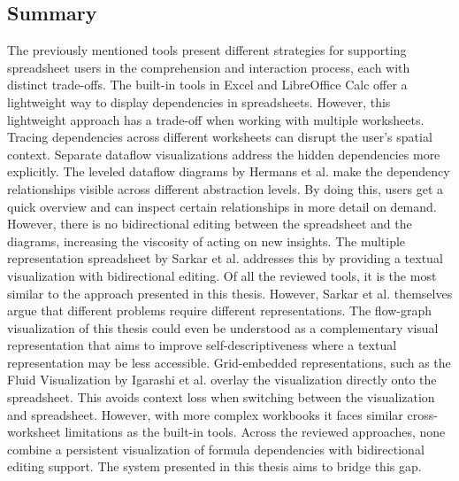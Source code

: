 \subsection{Summary}
The previously mentioned tools present different strategies for supporting spreadsheet users in the comprehension and interaction process, each with distinct trade-offs.
The built-in tools in Excel and LibreOffice Calc offer a lightweight way to display dependencies in spreadsheets. However, this lightweight approach has a trade-off when working with multiple worksheets. Tracing dependencies across different worksheets can disrupt the user's spatial context.
Separate dataflow visualizations address the hidden dependencies more explicitly. The leveled dataflow diagrams by Hermans et al. make the dependency relationships visible across different abstraction levels. By doing this, users get a quick overview and can inspect certain relationships in more detail on demand. However, there is no bidirectional editing between the spreadsheet and the diagrams, increasing the viscosity of acting on new insights. The multiple representation spreadsheet by Sarkar et al. addresses this by providing a textual visualization with bidirectional editing. Of all the reviewed tools, it is the most similar to the approach presented in this thesis. However, Sarkar et al. themselves argue that different problems require different representations. The flow-graph visualization of this thesis could even be understood as a complementary visual representation that aims to improve self-descriptiveness where a textual representation may be less accessible.
Grid-embedded representations, such as the Fluid Visualization by Igarashi et al. overlay the visualization directly onto the spreadsheet. This avoids context loss when switching between the visualization and spreadsheet. However, with more complex workbooks it faces similar cross-worksheet limitations as the built-in tools.
Across the reviewed approaches, none combine a persistent visualization of formula dependencies with bidirectional editing support. The system presented in this thesis aims to bridge this gap.